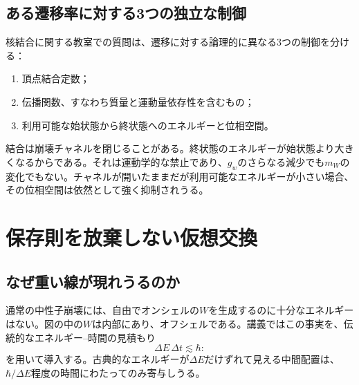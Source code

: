 \subsection{ある遷移率に対する3つの独立な制御}

核結合に関する教室での質問は、遷移に対する論理的に異なる3つの制御を分ける：
\begin{enumerate}
  \item 頂点結合定数；
  \item 伝播関数、すなわち質量と運動量依存性を含むもの；
  \item 利用可能な始状態から終状態へのエネルギーと位相空間。
\end{enumerate}
結合は崩壊チャネルを閉じることがある。終状態のエネルギーが始状態より大きくなるからである。それは運動学的な禁止であり、\(g_w\)のさらなる減少でも\(m_W\)の変化でもない。チャネルが開いたままだが利用可能なエネルギーが小さい場合、その位相空間は依然として強く抑制されうる。

\begin{classroomqa}
\end{classroomqa}

\begin{classroomqa}
\end{classroomqa}

\section{保存則を放棄しない仮想交換}

\subsection{なぜ重い線が現れうるのか}

通常の中性子崩壊には、自由でオンシェルの\(W\)を生成するのに十分なエネルギーはない。図の中の\(W\)は内部にあり、オフシェルである。講義ではこの事実を、伝統的なエネルギー--時間の見積もり
\begin{equation}
  \Delta E\,\Delta t\lesssim\hbar:
\end{equation}
を用いて導入する。古典的なエネルギーが\(\Delta E\)だけずれて見える中間配置は、
\(\hbar/\Delta E\)程度の時間にわたってのみ寄与しうる。

